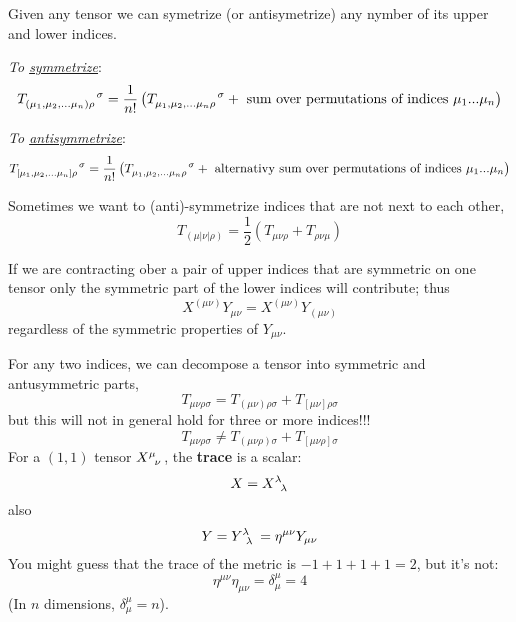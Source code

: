Given any tensor we can symetrize (or antisymetrize) any nymber of its upper and lower indices.

\textit{To \underline{symmetrize}}:
\begin{equation*}
    \tensor{T}{_{(\mu_1,\mu_2,...\mu_n)\rho}^\sigma}=\frac{1}{n!}\left(\tensor{T}{_{\mu_1,\mu_2,...\mu_n\rho}^\sigma} + \text{ sum over permutations of indices $\mu_1...\mu_n$}\right)
\end{equation*}

\textit{To \underline{antisymmetrize}}:
\begin{equation*}
    \tensor{T}{_{[\mu_1,\mu_2,...\mu_n]\rho}^\sigma}=\frac{1}{n!}\left(\tensor{T}{_{\mu_1,\mu_2,...\mu_n\rho}^\sigma} + \text{ alternativy sum over permutations of indices $\mu_1...\mu_n$}\right)
\end{equation*}

Sometimes we want to (anti)-symmetrize indices that are not next to each other,
\begin{equation*}
    T_{(\mu|\nu|\rho)}=\frac{1}{2}(T_{\mu\nu\rho} + T_{\rho\nu\mu})
\end{equation*}

If we are contracting ober a pair of upper indices that are symmetric on one tensor only the symmetric part of the lower indices will contribute; thus
\begin{equation*}
    X^{(\mu\nu)}Y_{\mu\nu}=X^{(\mu\nu)}Y_{(\mu\nu)}
\end{equation*}
regardless of the symmetric properties of $Y_{\mu\nu}$.

For any two indices, we can decompose a tensor into symmetric and antusymmetric parts,
\begin{equation*}
    T_{\mu\nu\rho\sigma}=T_{(\mu\nu)\rho\sigma}+T_{[\mu\nu]\rho\sigma}
\end{equation*}
but this will not in general hold for three or more indices!!!
\begin{equation*}
    T_{\mu\nu\rho\sigma}\neq T_{(\mu\nu\rho)\sigma}+T_{[\mu\nu\rho]\sigma}
\end{equation*}
For a $(1,1)$ tensor $\tensor{X}{^\mu_\nu}$, the \textbf{trace} is a scalar:
\begin{equation*}
    X=\tensor{X}{^\lambda_\lambda}
\end{equation*}
also
\begin{equation*}
    Y=\tensor{Y}{^\lambda_\lambda}=\eta^{\mu\nu}Y_{\mu\nu}
\end{equation*}
You might guess that the trace of the metric is $-1+1+1+1=2$, but it's not:
\begin{equation*}
    \eta^{\mu\nu}\eta_{\mu\nu}=\delta^\mu_\mu=4
\end{equation*}
(In $n$ dimensions, $\delta^\mu_\mu=n$).

